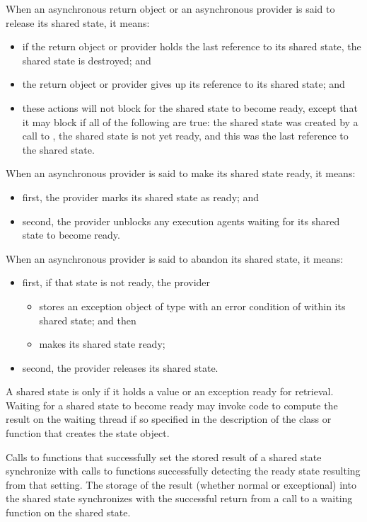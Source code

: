 \pnum
When an asynchronous return object or an asynchronous provider is said to release its
shared state, it means:
\begin{itemize}
\item
if the return object or provider holds the last reference to its shared state,
the shared state is destroyed; and

\item
the return object or provider gives up its reference to its shared state; and

\item these actions will not block for the shared state to become ready, except that it
may block if all of the following are true: the shared state was created by a call to
, the shared state is not yet ready, and this was the last reference
to the shared state.
\end{itemize}

\pnum
When an asynchronous provider is said to make its shared state ready, it means:
\begin{itemize}
\item
first, the provider marks its shared state as ready; and
\item
second, the provider unblocks any execution agents waiting for its shared
state to become ready.
\end{itemize}

\pnum
When an asynchronous provider is said to abandon its shared state, it means:
\begin{itemize}
\item
first, if that state is not ready, the provider
\begin{itemize}
\item
stores an exception object of type  with an error condition of
 within its shared state; and then
\item
makes its shared state ready;
\end{itemize}
\item
second, the provider releases its shared state.
\end{itemize}

\pnum
A shared state is  only if it holds a value or an exception ready for
retrieval.
Waiting for a shared state to become ready may invoke code to compute the result on
the waiting thread if so specified in the description of the class or function that creates
the state object.

\pnum
Calls to functions that successfully set the stored result of a shared
state synchronize
with calls to functions
successfully detecting the ready state resulting from that setting.
The storage of the result
(whether normal or exceptional) into the shared state
synchronizes with
the successful return from a call to a waiting function on the shared state.

